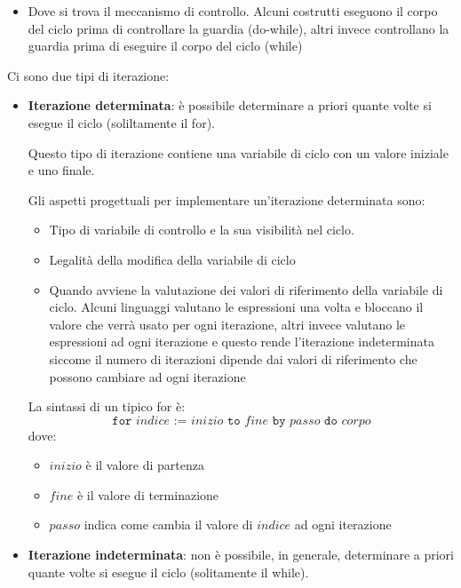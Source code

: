 \documentclass[a4paper]{article}
\begin{document}
\begin{itemize}
\begin{itemize}
      \item Dove si trova il meccanismo di controllo. Alcuni costrutti eseguono
        il corpo del ciclo prima di controllare la guardia (do-while), altri invece
        controllano la guardia prima di eseguire il corpo del ciclo (while)
    \end{itemize}

    Ci sono due tipi di iterazione:
    \begin{itemize}
      \item \textbf{Iterazione determinata}: è possibile determinare a priori
        quante volte si esegue il ciclo (soliltamente il for).

        Questo tipo di iterazione contiene una variabile di ciclo con un valore
        iniziale e uno finale.

        Gli aspetti progettuali per implementare un'iterazione
        determinata sono:
        \begin{itemize}
          \item Tipo di variabile di controllo e la sua visibilità nel ciclo.

          \item Legalità della modifica della variabile di ciclo

          \item Quando avviene la valutazione dei valori di riferimento
            della variabile di ciclo. Alcuni linguaggi valutano le espressioni
            una volta e bloccano il valore che verrà usato per ogni iterazione,
            altri invece valutano le espressioni ad ogni iterazione e questo rende
            l'iterazione indeterminata siccome il numero di iterazioni dipende dai
            valori di riferimento che possono cambiare ad ogni iterazione
        \end{itemize}
        La sintassi di un tipico for è:
        \[
          \texttt{for } indice \texttt{ := } inizio \texttt{ to } fine \texttt{ by }
          passo \texttt{ do } corpo
        \] 
        dove:
        \begin{itemize}
          \item \( inizio \) è il valore di partenza
          \item \( fine \) è il valore di terminazione
          \item \( passo \) indica come cambia il valore di \( indice \) ad ogni
            iterazione
        \end{itemize}

      \item \textbf{Iterazione indeterminata}: non è possibile, in generale,
        determinare a priori quante volte si esegue il ciclo (solitamente il while).


\end{itemize}
\end{itemize}
\end{document}
